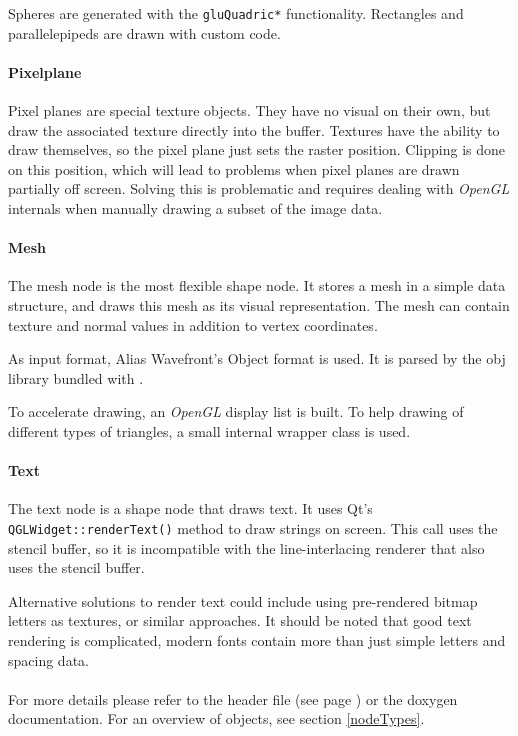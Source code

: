 Spheres are generated with the \lstinline{gluQuadric*} functionality.
Rectangles and parallelepipeds are drawn with custom code.

\paragraph{Pixelplane}
Pixel planes are special texture objects.
They have no visual on their own, but draw the associated texture directly into the buffer.
Textures have the ability to draw themselves, so the pixel plane just sets the raster position.
Clipping is done on this position, which will lead to problems when pixel planes are drawn partially off screen.
Solving this is problematic and requires dealing with \textit{OpenGL} internals when manually drawing a subset of the image data.

\paragraph{Mesh}
The mesh node is the most flexible shape node.
It stores a mesh in a simple data structure, and draws this mesh as its visual representation.
The mesh can contain texture and normal values in addition to vertex coordinates.

As input format, Alias Wavefront's Object format is used.
It is parsed by the obj library bundled with \ER.

To accelerate drawing, an \textit{OpenGL} display list is built.
To help drawing of different types of triangles, a small internal wrapper class is used.

\paragraph{Text}
The text node is a shape node that draws text.
It uses Qt's \lstinline{QGLWidget::renderText()} method to draw strings on screen.
This call uses the stencil buffer, so it is incompatible with the line-interlacing renderer that also uses the stencil buffer.

Alternative solutions to render text could include using pre-rendered bitmap letters as textures, or similar approaches.
It should be noted that good text rendering is complicated, modern fonts contain more than just simple letters and spacing data.

\paragraph{}
For more details please refer to the header file (see page \pageref{object.h}) or the doxygen documentation.
For an overview of objects, see section \ref{nodeTypes}.

